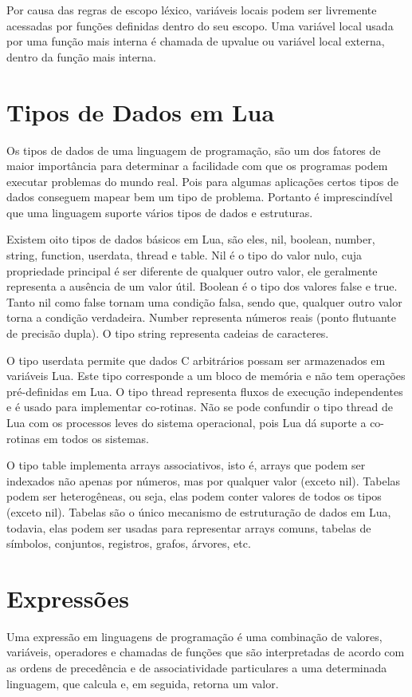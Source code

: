 \documentclass[
12pt, %
openright, %
oneside, %
a4paper, %
english, %
brazil, %
]{abntex2}
\begin{document}
Por causa das regras de escopo léxico, variáveis locais podem ser livremente acessadas por funções definidas dentro do seu escopo. Uma variável local usada por uma função mais interna é chamada de upvalue ou variável local externa, dentro da função mais interna.

\chapter{Tipos de Dados em Lua}
Os tipos de dados de uma linguagem de programação, são um dos fatores de maior importância para determinar a facilidade com que os programas podem executar problemas do mundo real. Pois para algumas aplicações certos tipos de dados conseguem mapear bem um tipo de problema. Portanto é imprescindível que uma linguagem suporte vários tipos de dados e estruturas.

Existem oito tipos de dados básicos em Lua, são eles, nil, boolean, number, string, function, userdata, thread e table. Nil é o tipo do valor nulo, cuja propriedade principal é ser diferente de qualquer outro valor, ele geralmente representa a ausência de um valor útil. Boolean é o tipo dos valores false e true. Tanto nil como false tornam uma condição falsa, sendo que, qualquer outro valor torna a condição verdadeira. Number representa números reais (ponto flutuante de precisão dupla). O tipo string representa cadeias de caracteres.

O tipo userdata permite que dados C arbitrários possam ser armazenados em variáveis Lua. Este tipo corresponde a um bloco de memória e não tem operações pré-definidas em Lua. O tipo thread representa fluxos de execução independentes e é usado para implementar co-rotinas. Não se pode confundir o tipo thread de Lua com os processos leves do sistema operacional, pois Lua dá suporte a co-rotinas em todos os sistemas.

O tipo table implementa arrays associativos, isto é, arrays que podem ser indexados não apenas por números, mas por qualquer valor (exceto nil). Tabelas podem ser heterogêneas, ou seja, elas podem conter valores de todos os tipos (exceto nil). Tabelas são o único mecanismo de estruturação de dados em Lua, todavia, elas podem ser usadas para representar arrays comuns, tabelas de símbolos, conjuntos, registros, grafos, árvores, etc.

\chapter{Expressões}
Uma expressão em linguagens de programação é uma combinação de valores, variáveis, operadores e chamadas de funções que são interpretadas de acordo com as ordens de precedência e de associatividade particulares a uma determinada linguagem, que calcula e, em seguida, retorna um valor.
\end{document}

